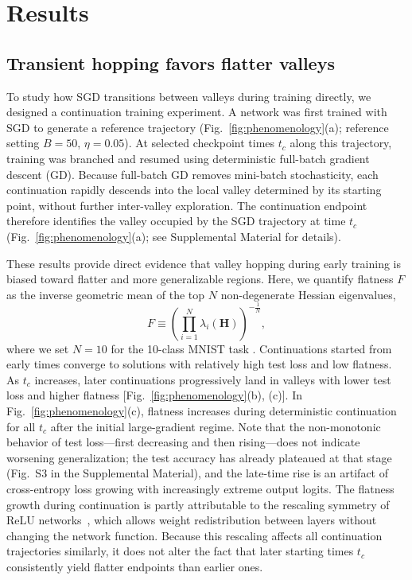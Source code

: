\documentclass[aps,prx,reprint,superscriptaddress,longbibliography,nofootinbib,floatfix]{revtex4-2}
\begin{document}
\section{Results}

\subsection{Transient hopping favors flatter valleys} 


To study how SGD transitions between valleys during training directly, we designed a continuation training experiment. A network was first trained with SGD to generate a reference trajectory (Fig.~\ref{fig:phenomenology}(a); reference setting $B = 50$, $\eta = 0.05$). At selected checkpoint times $t_c$ along this trajectory, training was branched and resumed using deterministic full-batch gradient descent (GD). Because full-batch GD removes mini-batch stochasticity, each continuation rapidly descends into the local valley determined by its starting point, without further inter-valley exploration. The continuation endpoint therefore identifies the valley occupied by the SGD trajectory at time $t_c$ (Fig.~\ref{fig:phenomenology}(a); see Supplemental Material for details).

These results provide direct evidence that valley hopping during early training is biased toward flatter and more generalizable regions. Here, we quantify flatness $F$ as the inverse geometric mean of the top $N$ non-degenerate Hessian eigenvalues,
\begin{equation}
F \equiv \left( \prod_{i=1}^{N} \lambda_i(\mathbf{H}) \right)^{-\tfrac{1}{N}},
\label{eq}
\end{equation}
where we set $N=10$ for the 10-class MNIST task \cite{sagunEmpiricalAnalysisHessian2018a}. Continuations started from early times converge to solutions with relatively high test loss and low flatness. As $t_c$ increases, later continuations progressively land in valleys with lower test loss and higher flatness [Fig.~\ref{fig:phenomenology}(b), (c)]. In Fig.~\ref{fig:phenomenology}(c), flatness increases during deterministic continuation for all $t_c$ after the initial large-gradient regime. Note that the non-monotonic behavior of test loss---first decreasing and then rising---does not indicate worsening generalization; the test accuracy has already plateaued at that stage (Fig.~S3 in the Supplemental Material), and the late-time rise is an artifact of cross-entropy loss growing with increasingly extreme output logits. The flatness growth during continuation is partly attributable to the rescaling symmetry of ReLU networks~\cite{fengActivityWeightDuality2023}, which allows weight redistribution between layers without changing the network function. Because this rescaling affects all continuation trajectories similarly, it does not alter the fact that later starting times $t_c$ consistently yield flatter endpoints than earlier ones.
\end{document}
